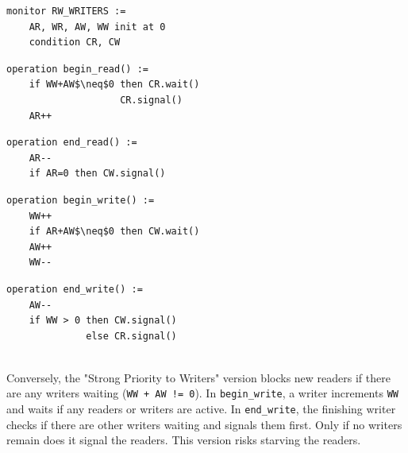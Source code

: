 \begin{minipage}{\textwidth}
\begin{lstlisting}[mathescape]
monitor RW_WRITERS :=
    AR, WR, AW, WW init at 0
    condition CR, CW
\end{lstlisting}
\begin{minipage}{0.45\textwidth}
\begin{lstlisting}[mathescape]
operation begin_read() :=
    if WW+AW$\neq$0 then CR.wait()
                    CR.signal()
    AR++
\end{lstlisting}
\end{minipage}
\hfill
\begin{minipage}{0.45\textwidth}
\begin{lstlisting}[mathescape]
operation end_read() :=
    AR--
    if AR=0 then CW.signal()
\end{lstlisting}
\end{minipage}
\begin{minipage}{0.45\textwidth}
\begin{lstlisting}[mathescape]
operation begin_write() :=
    WW++
    if AR+AW$\neq$0 then CW.wait()
    AW++
    WW--
\end{lstlisting}
\end{minipage}
\hfill
\begin{minipage}{0.45\textwidth}
\begin{lstlisting}[mathescape]
operation end_write() :=
    AW--
    if WW > 0 then CW.signal()
              else CR.signal()
\end{lstlisting}
\end{minipage}
\end{minipage}\\

Conversely, the "Strong Priority to Writers" version blocks new readers if there are any writers waiting (\texttt{WW + AW != 0}). In \texttt{begin\_write}, a writer increments \texttt{WW} and waits if any readers or writers are active. In \texttt{end\_write}, the finishing writer checks if there are other writers waiting and signals them first. Only if no writers remain does it signal the readers. This version risks starving the readers.

